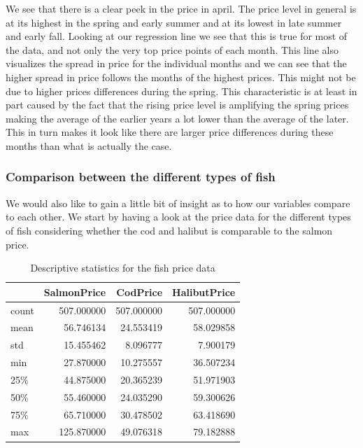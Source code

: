 We see that there is a clear peek in the price in april. The price level in general is at its highest in the spring and early summer and at its lowest in late summer and early fall. Looking at our regression line we see that this is true for most of the data, and not only the very top price points of each month. This line also visualizes the spread in price for the individual months and we can see that the higher spread in price follows the months of the highest prices. This might not be due to higher prices differences during the spring. This characteristic is at least in part caused by the fact that the rising price level is amplifying the spring prices making the average of the earlier years a lot lower than the average of the later. This in turn makes it look like there are larger price differences during these months than what is actually the case.

\subsubsection{Comparison between the different types of fish}\label{Comparison between the different types of fish}
We would also like to gain a little bit of insight as to how our variables compare to each other. We start by having a look at the price data for the different types of fish considering whether the cod and halibut is comparable to the salmon price.

\begin{table}[H]
    \begin{center}
    \begin{tabular}{lrrr}
        \toprule
        {} &  SalmonPrice &    CodPrice &  HalibutPrice \\
        \midrule
        count &   507.000000 &  507.000000 &    507.000000 \\
        mean  &    56.746134 &   24.553419 &     58.029858 \\
        std   &    15.455462 &    8.096777 &      7.900179 \\
        min   &    27.870000 &   10.275557 &     36.507234 \\
        25\%   &    44.875000 &   20.365239 &     51.971903 \\
        50\%   &    55.460000 &   24.035290 &     59.300626 \\
        75\%   &    65.710000 &   30.478502 &     63.418690 \\
        max   &   125.870000 &   49.076318 &     79.182888 \\
        \bottomrule
    \end{tabular}
    \end{center}
    \caption{Descriptive statistics for the fish price data}
\end{table}

